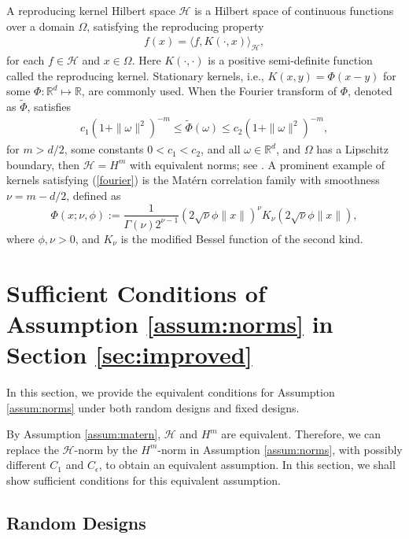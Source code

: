 \documentclass[12pt]{article}
\theoremstyle{plain}
\theoremstyle{remark}
\begin{document}
A reproducing kernel Hilbert space $\mathcal{H}$ is a Hilbert space of continuous functions over a domain $\Omega$, satisfying the reproducing property
\begin{eqnarray}\label{reproducing}
    f(x)=\langle f,K(\cdot,x)\rangle_\mathcal{H},
\end{eqnarray}
for each $f\in\mathcal{H}$ and $x\in\Omega$. Here $K(\cdot,\cdot)$ is a positive semi-definite function called the reproducing kernel.
Stationary kernels, i.e., $K(x,y)=\Phi(x-y)$ for some $\Phi:\mathbb{R}^d\mapsto\mathbb{R}$, are commonly used. When the Fourier transform of $\Phi$, denoted as $\tilde{\Phi}$, satisfies
\begin{eqnarray}\label{fourier}
    c_1(1+\|\omega\|^2)^{-m}\leq \tilde{\Phi}(\omega)\leq c_2(1+\|\omega\|^2)^{-m},
\end{eqnarray}
for $m>d/2$, some constants $0<c_1<c_2$, and all $\omega\in\mathbb{R}^d$, and $\Omega$ has a Lipschitz boundary, then $\mathcal{H}=H^m$ with equivalent norms; see \cite{wendland2004scattered}. A prominent example of kernels satisfying (\ref{fourier}) is the Mat\'ern correlation family \cite{stein2012interpolation} with smoothness $\nu=m-d/2$, defined as
\[\Phi(x;\nu,\phi):=\frac{1}{\Gamma(\nu)2^{\nu-1}}(2\sqrt{\nu}\phi\|x\|)^\nu K_\nu(2\sqrt{\nu}\phi\|x\|),\]
where $\phi,\nu>0$, and $K_\nu$ is the modified Bessel function of the second kind.

\section{Sufficient Conditions of Assumption \ref{assum:norms} in Section \ref{sec:improved}}\label{sec:sufficient}
In this section, we provide the equivalent conditions for Assumption \ref{assum:norms} under both random designs and fixed designs.

By Assumption \ref{assum:matern}, $\mathcal{H}$ and $H^m$ are equivalent. Therefore, we can replace the $\mathcal{H}$-norm by the $H^m$-norm in Assumption \ref{assum:norms}, with possibly different $C_1$ and $C_\epsilon$, to obtain an equivalent assumption. In this section, we shall show sufficient conditions for this equivalent assumption.

\subsection{Random Designs}

\end{document}
